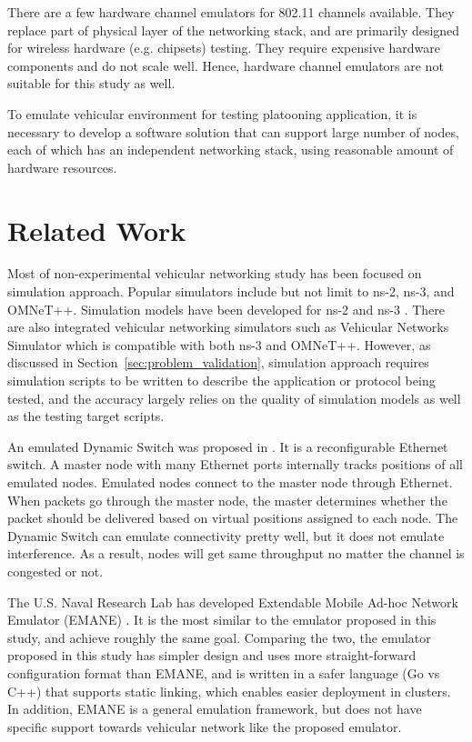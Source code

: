\documentclass[12pt]{report}
\begin{document}
There are a few hardware channel emulators for 802.11 channels available. They replace part of physical layer of the networking stack, and are primarily designed for wireless hardware (e.g. chipsets) testing. They require expensive hardware components and do not scale well. Hence, hardware channel emulators are not suitable for this study as well.

To emulate vehicular environment for testing platooning application, it is necessary to develop a software solution that can support large number of nodes, each of which has an independent networking stack, using reasonable amount of hardware resources.


\section{Related Work}

Most of non-experimental vehicular networking study has been focused on simulation approach. Popular simulators include but not limit to ns-2, ns-3\cite{henderson2008network}, and OMNeT++\cite{varga2008overview}. Simulation models have been developed for ns-2 \cite{Chen2006ns2} and ns-3 \cite{Arbabi2010ns3,benin2012ns3}. There are also integrated vehicular networking simulators such as Vehicular Networks Simulator \cite{fernandes2012} which is compatible with both ns-3 and OMNeT++. However, as discussed in Section~\ref{sec:problem_validation}, simulation approach requires simulation scripts to be written to describe the application or protocol being tested, and the accuracy largely relies on the quality of simulation models as well as the testing target scripts.

An emulated Dynamic Switch was proposed in \cite{lin2004mobile}. It is a reconfigurable Ethernet switch. A master node with many Ethernet ports internally tracks positions of all emulated nodes. Emulated nodes connect to the master node through Ethernet. When packets go through the master node, the master determines whether the packet should be delivered based on virtual positions assigned to each node. The Dynamic Switch can emulate connectivity pretty well, but it does not emulate interference. As a result, nodes will get same throughput no matter the channel is congested or not.

The U.S. Naval Research Lab has developed Extendable Mobile Ad-hoc Network Emulator (EMANE) \cite{EMANE}. It is the most similar to the emulator proposed in this study, and achieve roughly the same goal. Comparing the two, the emulator proposed in this study has simpler design and uses more straight-forward configuration format than EMANE, and is written in a safer language (Go vs C++) that supports static linking, which enables easier deployment in clusters. In addition, EMANE is a general emulation framework, but does not have specific support towards vehicular network like the proposed emulator.
\end{document}
